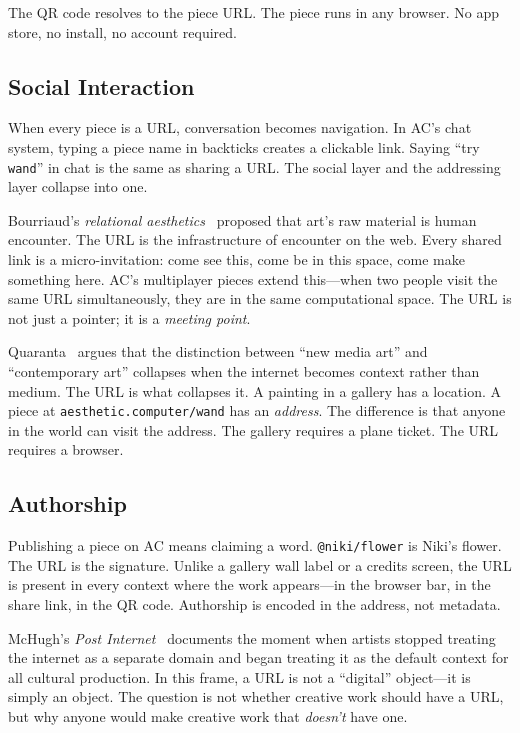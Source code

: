 \documentclass[10pt,letterpaper,twocolumn]{article}
\newcommand{\code}[1]{\texttt{#1}}
\begin{document}
The QR code resolves to the piece URL. The piece runs in any browser. No app store, no install, no account required.

\subsection{Social Interaction}

When every piece is a URL, conversation becomes navigation. In AC's chat system, typing a piece name in backticks creates a clickable link. Saying ``try \code{wand}'' in chat is the same as sharing a URL. The social layer and the addressing layer collapse into one.

Bourriaud's \emph{relational aesthetics}~\citep{bourriaud2002relational} proposed that art's raw material is human encounter. The URL is the infrastructure of encounter on the web. Every shared link is a micro-invitation: come see this, come be in this space, come make something here. AC's multiplayer pieces extend this---when two people visit the same URL simultaneously, they are in the same computational space. The URL is not just a pointer; it is a \emph{meeting point}.

Quaranta~\citep{quaranta2013beyond} argues that the distinction between ``new media art'' and ``contemporary art'' collapses when the internet becomes context rather than medium. The URL is what collapses it. A painting in a gallery has a location. A piece at \code{aesthetic.computer/wand} has an \emph{address}. The difference is that anyone in the world can visit the address. The gallery requires a plane ticket. The URL requires a browser.

\subsection{Authorship}

Publishing a piece on AC means claiming a word. \code{@niki/flower} is Niki's flower. The URL is the signature. Unlike a gallery wall label or a credits screen, the URL is present in every context where the work appears---in the browser bar, in the share link, in the QR code. Authorship is encoded in the address, not metadata.

McHugh's \emph{Post Internet}~\citep{mchugh2019postinternet} documents the moment when artists stopped treating the internet as a separate domain and began treating it as the default context for all cultural production. In this frame, a URL is not a ``digital'' object---it is simply an object. The question is not whether creative work should have a URL, but why anyone would make creative work that \emph{doesn't} have one.
\end{document}
